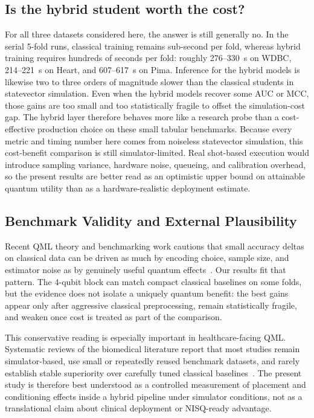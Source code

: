 \documentclass[11pt,a4paper]{article}
\begin{document}
\subsection{Is the hybrid student worth the cost?}
For all three datasets considered here, the answer is still generally no. In the serial 5-fold runs,
classical training remains sub-second per fold, whereas hybrid training requires hundreds of seconds
per fold: roughly 276--330~s on WDBC, 214--221~s on Heart, and 607--617~s on Pima. Inference for
the hybrid models is likewise two to three orders of magnitude slower than the classical students in
statevector simulation. Even when the hybrid models recover some AUC or MCC, those gains are too
small and too statistically fragile to offset the simulation-cost gap. The hybrid layer therefore
behaves more like a research probe than a cost-effective production choice on these small tabular
benchmarks.
Because every metric and timing number here comes from noiseless statevector simulation, this
cost-benefit comparison is still simulator-limited. Real shot-based execution would introduce
sampling variance, hardware noise, queueing, and calibration overhead, so the present results are
better read as an optimistic upper bound on attainable quantum utility than as a hardware-realistic
deployment estimate.

\subsection{Benchmark Validity and External Plausibility}
Recent QML theory and benchmarking work cautions that small accuracy deltas on classical data can be
driven as much by encoding choice, sample size, and estimator noise as by genuinely useful quantum
effects~\cite{caro2022generalization,peters2021highdim,thanasilp2024kernel}. Our results fit that
pattern. The 4-qubit block can match compact classical baselines on some folds, but the evidence does
not isolate a uniquely quantum benefit: the best gains appear only after aggressive classical
preprocessing, remain statistically fragile, and weaken once cost is treated as part of the
comparison.

This conservative reading is especially important in healthcare-facing QML. Systematic reviews of the
biomedical literature report that most studies remain simulator-based, use small or repeatedly reused
benchmark datasets, and rarely establish stable superiority over carefully tuned classical
baselines~\cite{maheshwari2022biomedical,gupta2025digitalhealth}. The present study is therefore best
understood as a controlled measurement of placement and conditioning effects inside a hybrid
pipeline under simulator conditions, not as a translational claim about clinical deployment or
NISQ-ready advantage.
\end{document}
